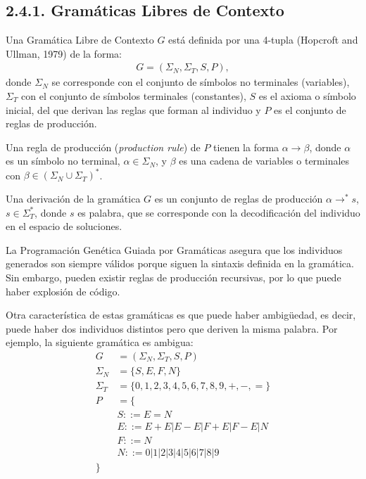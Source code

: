 \documentclass[spanish,a4paper,12pt,twoside]{report}
\begin{document}
    \subsection*{\large 2.4.1. Gramáticas Libres de Contexto}
    Una Gramática Libre de Contexto $G$ está definida por una 4-tupla (Hopcroft and Ullman, 1979) de la forma: 
    \begin{align}
    G = (\Sigma_{N}, \Sigma_{T}, S, P), \label{eq:1}\tag{1}
    \end{align}
    donde $\Sigma_{N}$ se corresponde con el conjunto de símbolos no terminales (variables), $\Sigma_{T}$ con el conjunto de símbolos terminales (constantes), $S$ es el axioma o símbolo inicial, del que derivan las reglas que forman al individuo y $P$ es el conjunto de reglas de producción. \par
    Una regla de producción (\emph{production rule}) de $P$ tienen la forma $\alpha \rightarrow \beta$, donde $\alpha$ es un símbolo no terminal, $\alpha \in \Sigma_{N}$, y $\beta$ es una cadena de variables o terminales con $\beta \in (\Sigma_{N} \cup \Sigma_{T})^*$. \par
    Una derivación de la gramática $G$ es un conjunto de reglas de producción $\alpha \rightarrow^*s$, $s \in \Sigma_{T}^*$, donde $s$ es palabra, que se corresponde con la decodificación del individuo en el espacio de soluciones. \par
    La Programación Genética Guiada por Gramáticas asegura que los individuos generados son siempre válidos porque siguen la sintaxis definida en la gramática. Sin embargo, pueden existir reglas de producción recursivas, por lo que puede haber explosión de código. \par
    Otra característica de estas gramáticas es que puede haber ambigüedad, es decir, puede haber dos individuos distintos pero que deriven la misma palabra. Por ejemplo, la siguiente gramática es ambigua: \\
    \begin{align*}
    G &= (\Sigma_{N}, \Sigma_{T}, S, P) \label{eq:2}\tag{2} \\
    \Sigma_{N} &= \{S, E, F, N\} \\
    \Sigma_{T} &= \{0, 1, 2, 3, 4, 5, 6, 7, 8, 9, +, -, =\} \\
    P &= \{ \\
    &S ::= E = N \\
    &E ::= E + E | E - E | F + E | F - E | N \\
    &F ::= N \\
    &N ::= 0 | 1 | 2 | 3 | 4 | 5 | 6 | 7 | 8 | 9 \\
    \}
    \end{align*} \par
\end{document}
